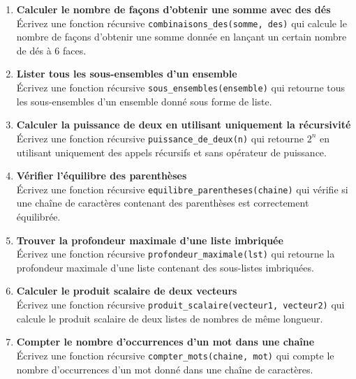 

\begin{enumerate}

    \item \textbf{Calculer le nombre de façons d'obtenir une somme avec des dés} \\
    Écrivez une fonction récursive \texttt{combinaisons\_des(somme, des)} qui calcule le nombre de façons d'obtenir une somme donnée en lançant un certain nombre de dés à $6$ faces.

    \item \textbf{Lister tous les sous-ensembles d'un ensemble} \\
    Écrivez une fonction récursive \texttt{sous\_ensembles(ensemble)} qui retourne tous les sous-ensembles d'un ensemble donné sous forme de liste.

    \item \textbf{Calculer la puissance de deux en utilisant uniquement la récursivité} \\
    Écrivez une fonction récursive \texttt{puissance\_de\_deux(n)} qui retourne $2^n$ en utilisant uniquement des appels récursifs et sans opérateur de puissance.

    \item \textbf{Vérifier l'équilibre des parenthèses} \\
    Écrivez une fonction récursive \texttt{equilibre\_parentheses(chaine)} qui vérifie si une chaîne de caractères contenant des parenthèses est correctement équilibrée.

    \item \textbf{Trouver la profondeur maximale d'une liste imbriquée} \\
    Écrivez une fonction récursive \texttt{profondeur\_maximale(lst)} qui retourne la profondeur maximale d'une liste contenant des sous-listes imbriquées.

    \item \textbf{Calculer le produit scalaire de deux vecteurs} \\
    Écrivez une fonction récursive \texttt{produit\_scalaire(vecteur1, vecteur2)} qui calcule le produit scalaire de deux listes de nombres de même longueur.

    \item \textbf{Compter le nombre d’occurrences d'un mot dans une chaîne} \\
    Écrivez une fonction récursive \texttt{compter\_mots(chaine, mot)} qui compte le nombre d'occurrences d'un mot donné dans une chaîne de caractères.


\end{enumerate}
